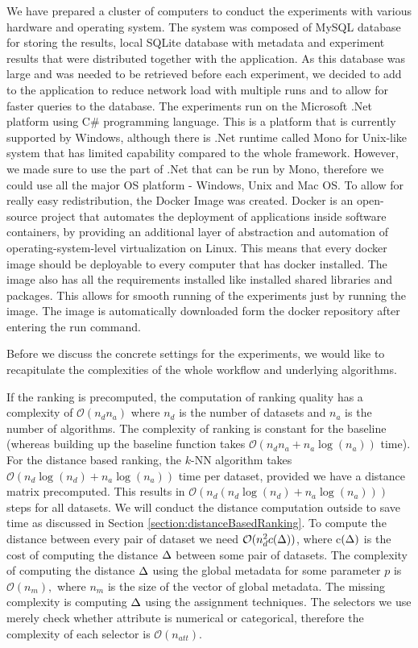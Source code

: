 We have prepared a cluster of computers to conduct the experiments with various hardware and operating system. The system was composed of MySQL database for storing the results, local SQLite database with metadata and experiment results that were distributed together with the application. As this database was large and was needed to be retrieved before each experiment, we decided to add to the application to reduce network load with multiple runs and to allow for faster queries to the database. The experiments run on the Microsoft .Net platform using C\# programming language. This is a platform that is currently supported by Windows, although there is .Net runtime called Mono for Unix-like system that has limited capability compared to the whole framework. However, we made sure to use the part of .Net that can be run by Mono, therefore we could use all the major OS platform - Windows, Unix and Mac OS. To allow for really easy redistribution, the Docker Image \cite{docker} was created. Docker is an open-source project that automates the deployment of applications inside software containers, by providing an additional layer of abstraction and automation of operating-system-level virtualization on Linux. This means that every docker image should be deployable to every computer that has docker installed. The image also has all the requirements installed like installed shared libraries and packages. This allows for smooth running of the experiments just by running the image. The image is automatically downloaded form the docker repository after entering the run command.

Before we discuss the concrete settings for the experiments, we would like to recapitulate the complexities of the whole workflow and underlying algorithms. 

If the ranking is precomputed, the computation of ranking quality has a complexity of $\mathcal{O}(n_dn_a)$ where $n_d$ is the number of datasets and $n_a$ is the number of algorithms.
 The complexity of ranking is constant for the baseline (whereas building up the baseline function takes  $\mathcal{O}(n_dn_a + n_a\log(n_a))$ time). For the distance based ranking, the $k$-NN algorithm takes $\mathcal{O}(n_d\log(n_d)+n_a\log(n_a))$ time per dataset, provided we have a distance matrix precomputed. This results in $\mathcal{O}(n_d(n_d\log(n_d)+n_a\log(n_a)))$ steps for all datasets. We will conduct the distance computation outside to save time as discussed in Section \ref{section:distanceBasedRanking}. To compute the distance between every pair of dataset we need $\mathcal{O}(n_d^2c(\Delta))$, where c$(\Delta)$ is the cost of computing the distance $\Delta$ between some pair of datasets. The complexity of computing the distance $\Delta$ using the global metadata for some parameter $p$ is $\mathcal{O}(n_m),$ where $n_m$ is the size of the vector of global metadata. The missing complexity is computing $\Delta$ using the assignment techniques. The selectors we use merely check whether attribute is numerical or categorical, therefore the complexity of each selector is $\mathcal{O}(n_{att})$. 
 
